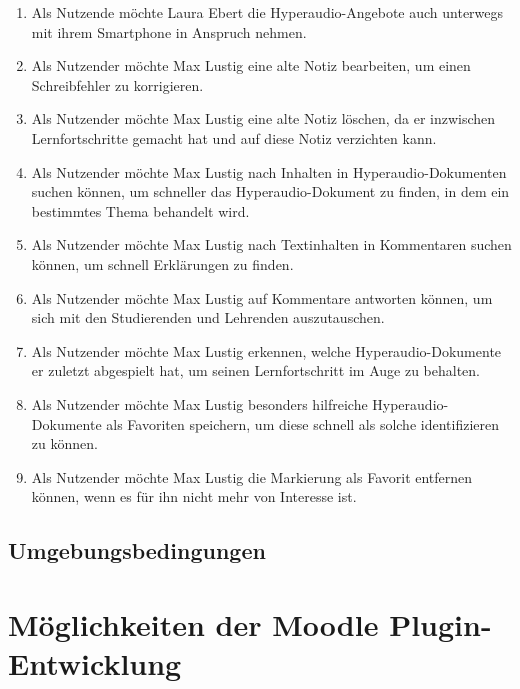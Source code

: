 \begin{enumerate}
\item Als Nutzende möchte Laura Ebert die Hyperaudio-Angebote auch unterwegs mit ihrem Smartphone in Anspruch nehmen.

\item Als Nutzender möchte Max Lustig eine alte Notiz bearbeiten, um einen Schreibfehler zu korrigieren.

\item Als Nutzender möchte Max Lustig eine alte Notiz löschen, da er inzwischen Lernfortschritte gemacht hat und auf diese Notiz verzichten kann.

\item Als Nutzender möchte Max Lustig nach Inhalten in Hyperaudio-Dokumenten suchen können, um schneller das Hyperaudio-Dokument zu finden, in dem ein bestimmtes Thema behandelt wird.

\item Als Nutzender möchte Max Lustig nach Textinhalten in Kommentaren suchen können, um schnell Erklärungen zu finden.

\item Als Nutzender möchte Max Lustig auf Kommentare antworten können, um sich mit den Studierenden und Lehrenden auszutauschen.

\item Als Nutzender möchte Max Lustig erkennen, welche Hyperaudio-Dokumente er zuletzt abgespielt hat, um seinen Lernfortschritt im Auge zu behalten.

\item Als Nutzender möchte Max Lustig besonders hilfreiche Hyperaudio-Dokumente als Favoriten speichern, um diese schnell als solche identifizieren zu können.

\item Als Nutzender möchte Max Lustig die Markierung als Favorit entfernen können, wenn es für ihn nicht mehr von Interesse ist.

\end{enumerate}




\subsection{Umgebungsbedingungen}



\section{Möglichkeiten der Moodle Plugin-Entwicklung}

